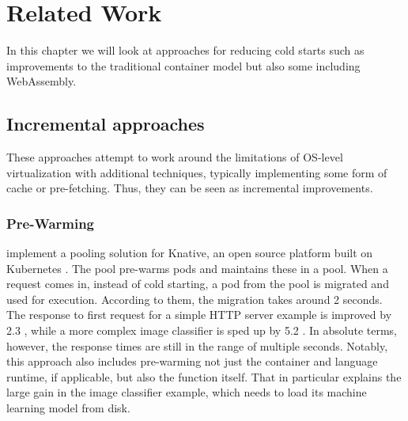 \chapter{Related Work}
\label{chapter:relatedwork}

In this chapter we will look at approaches for reducing cold starts such as improvements to the traditional container model but also some including WebAssembly.

\section{Incremental approaches}

These approaches attempt to work around the limitations of OS-level virtualization with additional techniques, typically implementing some form of cache or pre-fetching. Thus, they can be seen as incremental improvements.

\subsection{Pre-Warming}

\citeauthor{Lin2019} implement a pooling solution for Knative, an open source platform built on Kubernetes \cite{Lin2019}. The pool pre-warms pods and maintains these in a pool. When a request comes in, instead of cold starting, a pod from the pool is migrated and used for execution. According to them, the migration takes around 2 seconds. The response to first request for a simple HTTP server example is improved by 2.3 \times, while a more complex image classifier is sped up by 5.2 \times. In absolute terms, however, the response times are still in the range of multiple seconds. Notably, this approach also includes pre-warming not just the container and language runtime, if applicable, but also the function itself. That in particular explains the large gain in the image classifier example, which needs to load its machine learning model from disk.

